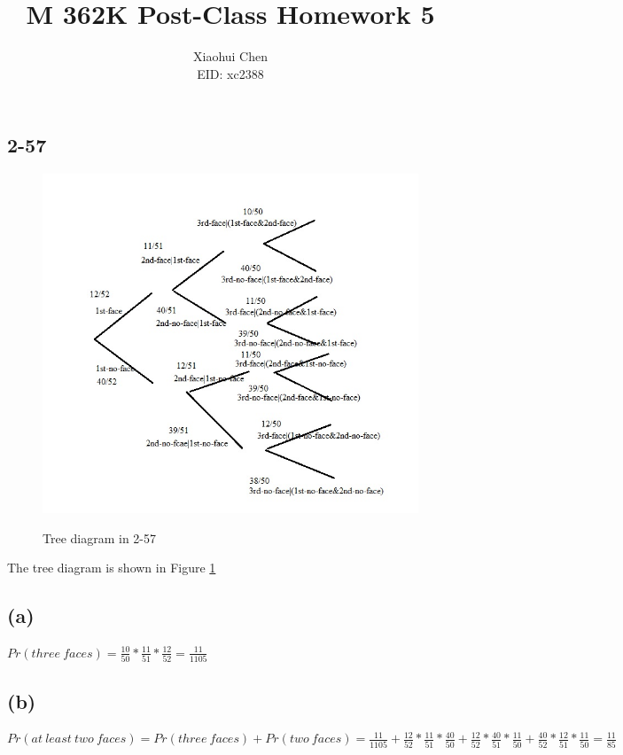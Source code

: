 \documentclass[12pt]{article}
\author{Xiaohui Chen \\EID: xc2388}
\title{M 362K Post-Class Homework 5}
\begin{document}
\maketitle
\begin{spacing}{1.9}

\section*{2-57}

\begin{figure}
  \centering
  \includegraphics[width=6.5in]{out1}\\
  \caption{Tree diagram in 2-57}\label{out1}
\end{figure}

The tree diagram is shown in Figure \ref{out1} 

\subsection*{(a)}
$Pr(three\ faces)=\frac{10}{50}* \frac{11}{51}* \frac{12}{52}= \frac{11}{1105}$

\subsection*{(b)}
$Pr(at\ least\ two\ faces)=Pr(three\ faces)+Pr(two\ faces)= \frac{11}{1105}+\frac{12}{52}* \frac{11}{51}* \frac{40}{50} + \frac{12}{52}*\frac{40}{51}* \frac{11}{50}+ \frac{40}{52}* \frac{12}{51}*\frac{11}{50}=\frac{11}{85}$


\end{spacing}
\end{document}
